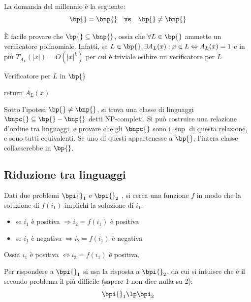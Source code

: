La domanda del millennio è la seguente:
\begin{equation*}
    \bp{} = \bnp{}
    \quad
    \texttt{vs}
    \quad
    \bp{} \neq \bnp{}
\end{equation*}

È facile provare che $\bp{} \subseteq \bnp{}$, ossia che $\forall L \in \bp{}$ ammette un verificatore polinomiale. Infatti, se $L \in \bp{}, \exists A_{L}(x) : x \in L \Leftrightarrow A_L (x) = 1$ e in più $T_{A_{L}} (|x|) = O \left( |x|^{k} \right)$ per cui è triviale esibire un verificatore per $L$
\begin{algorithm}[H]
    \caption{Verificatore per $L$ in $\bp{}$}\label{alg:verificap}
\begin{algorithmic}[1]
        \State return $A_L (x)$
    \EndProcedure
\end{algorithmic}
\end{algorithm}

Sotto l'ipotesi $\bp{} \neq \bnp{} $, si trova una classe di linguaggi $\bnpc{} \subseteq \bp{} - \bnp{} $ detti NP-completi. Si può costruire una relazione d'ordine tra linguaggi, e provare che gli $\bnpc{}$ sono i $\sup$ di questa relazione, e sono tutti equivalenti. Se uno di questi appartenesse a $\bp{}$, l'intera classe collasserebbe in $\bp{}$.



\subsection{Riduzione tra linguaggi}

Dati due problemi
$\bpi{}_1$
e
$\bpi{}_2$
, si cerca una funzione $f$ in modo che la soluzione di $f(i_1)$ implichi la soluzione di $i_1$.
\begin{itemize}[noitemsep,parsep=0pt,partopsep=0pt,topsep=0pt]
    \item se $i_1$ è positiva $\Rightarrow i_2 = f(i_1)$ è positiva
    \item se $i_1$ è negativa $\Rightarrow i_2 = f(i_1)$ è negativa
\end{itemize}
Ossia $i_1$ è positiva $\Leftrightarrow i_2 = f(i_1)$ è positiva.

Per rispondere a $\bpi{}_1$ si usa la risposta a $\bpi{}_2$, da cui si intuisce che è il secondo problema il più difficile (sapere 1 non dice nulla su 2):
\begin{equation*}
\bpi{}_1
\lp
\bpi_2
\end{equation*}

